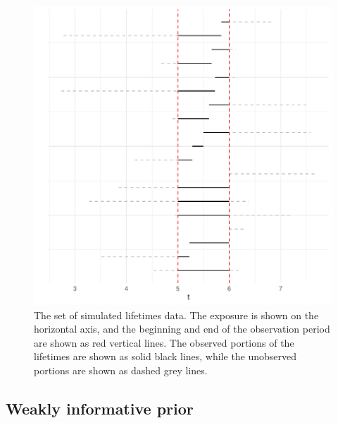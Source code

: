 \begin{figure}[t]
    \centering
    \includegraphics[width=1\textwidth]{./figures/ch-2/sim-data.pdf}
    \caption{The set of simulated lifetimes data. The exposure is shown on the horizontal axis, and the beginning and end of the observation period are shown as red vertical lines. The observed portions of the lifetimes are shown as solid black lines, while the unobserved portions are shown as dashed grey lines.}
    \label{fig:sim_censored_units}
\end{figure}



\subsection{Weakly informative prior} \label{subsec:weibull-model-fits}

